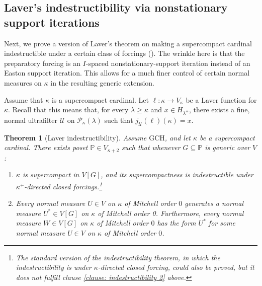 \documentclass[11pt]{amsart}
\newtheorem{theorem}{Theorem}[section]
\theoremstyle{definition}
\theoremstyle{remark}
\newcommand\<{{<}}
\newcommand{\po}{\mathbb{P}}
\begin{document}
    \subsection{Laver's indestructibility  via nonstationary support iterations}

    Next, we prove a version of Laver's theorem on making a supercompact cardinal indestructible under a certain class of forcings (\cite{Lav}). The wrinkle  here is that the  preparatory forcing is an $I$-spaced nonstationary-support iteration instead of an Easton support iteration. This allows for a much finer control of certain normal measures on $\kappa$ in the resulting generic extension.

    Assume that $\kappa$ is a supercompact cardinal. Let $\ell\colon \kappa\to V_\kappa$ be a Laver function for $\kappa$. Recall that this means that, for every $\lambda\geq \kappa$ and $x\in H_{\lambda^+}$, there exists a fine, normal ultrafilter $\mathcal{U}$  on $\mathcal{P}_{\kappa}(\lambda)$ such that $j_{\mathcal{U}}(\ell)(\kappa) = x$.

    \begin{theorem}[Laver indestructibility]\label{theorem: Laver indestructibility}
        Assume $\mathrm{GCH}$, and let $\kappa$ be a supercompact cardinal. There exists poset $\po\in V_{\kappa+2}$ such that whenever $G\subseteq \po$ is generic over $V$:
        \begin{enumerate}
            \item $\kappa$ is supercompact in $V[G]$, and its supercompactness is indestructible under $\kappa^+$-directed closed forcings.\footnote{The standard version of the indestructibility  theorem, in which the indestructibility is under $\kappa$-directed closed forcing, could also be proved, but it does not fulfill clause \eqref{clause: indestructibility 2} above.}
            \item\label{clause: indestructibility 2} Every normal measure $U\in V$ on $\kappa$ of Mitchell order $0$ generates a normal measure $U^*\in V[G]$ on $\kappa$ of Mitchell order 0. Furthermore, every normal measure $W\in V[G]$ on $\kappa$ of Mitchell order $0$ has the form $U^*$ for some normal measure $U\in V$ on $\kappa$ of Mitchell order $0$.
        \end{enumerate}
    \end{theorem}
\end{document}
